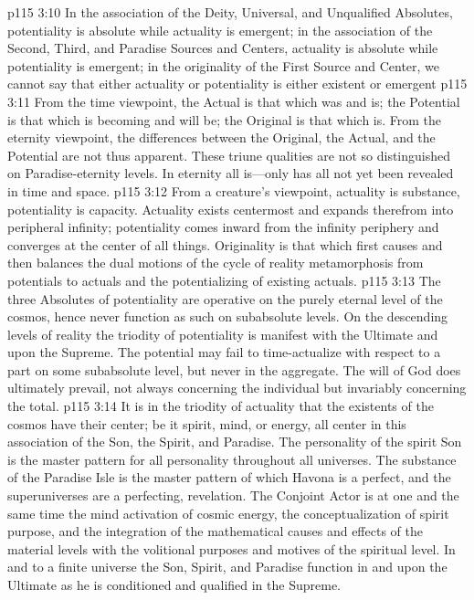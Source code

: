 \vs p115 3:10 In the association of the Deity, Universal, and Unqualified Absolutes, potentiality is absolute while actuality is emergent; in the association of the Second, Third, and Paradise Sources and Centers, actuality is absolute while potentiality is emergent; in the originality of the First Source and Center, we cannot say that either actuality or potentiality is either existent or emergent
\vs p115 3:11 From the time viewpoint, the Actual is that which was and is; the Potential is that which is becoming and will be; the Original is that which is. From the eternity viewpoint, the differences between the Original, the Actual, and the Potential are not thus apparent. These triune qualities are not so distinguished on Paradise\hyp{}eternity levels. In eternity all is---only has all not yet been revealed in time and space.
\vs p115 3:12 From a creature’s viewpoint, actuality is substance, potentiality is capacity. Actuality exists centermost and expands therefrom into peripheral infinity; potentiality comes inward from the infinity periphery and converges at the center of all things. Originality is that which first causes and then balances the dual motions of the cycle of reality metamorphosis from potentials to actuals and the potentializing of existing actuals.
\vs p115 3:13 The three Absolutes of potentiality are operative on the purely eternal level of the cosmos, hence never function as such on subabsolute levels. On the descending levels of reality the triodity of potentiality is manifest with the Ultimate and upon the Supreme. The potential may fail to time\hyp{}actualize with respect to a part on some subabsolute level, but never in the aggregate. The will of God does ultimately prevail, not always concerning the individual but invariably concerning the total.
\vs p115 3:14 It is in the triodity of actuality that the existents of the cosmos have their center; be it spirit, mind, or energy, all center in this association of the Son, the Spirit, and Paradise. The personality of the spirit Son is the master pattern for all personality throughout all universes. The substance of the Paradise Isle is the master pattern of which Havona is a perfect, and the superuniverses are a perfecting, revelation. The Conjoint Actor is at one and the same time the mind activation of cosmic energy, the conceptualization of spirit purpose, and the integration of the mathematical causes and effects of the material levels with the volitional purposes and motives of the spiritual level. In and to a finite universe the Son, Spirit, and Paradise function in and upon the Ultimate as he is conditioned and qualified in the Supreme.
